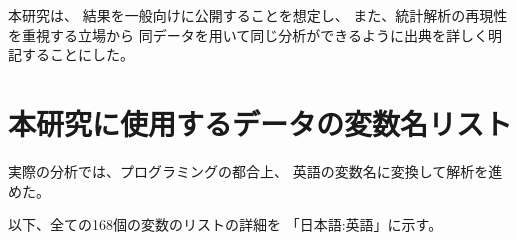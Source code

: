 本研究は、
結果を一般向けに公開することを想定し、
また、統計解析の再現性を重視する立場から
同データを用いて同じ分析ができるように出典を詳しく明記することにした。




%
%
%
%


%
%
%
%







\chapter{本研究に使用するデータの変数名リスト}
\label{datalist}


実際の分析では、プログラミングの都合上、
英語の変数名に変換して解析を進めた。

以下、全ての168個の変数のリストの詳細を
「日本語:英語」に示す。


%
%
%
%
%
%
%
%
%
%
%
%
%


